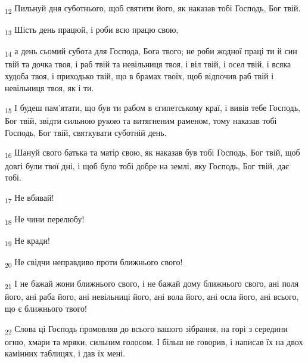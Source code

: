 \begin{tcolorbox}
\textsubscript{12} Пильнуй дня суботнього, щоб святити його, як наказав тобі Господь, Бог твій.
\end{tcolorbox}
\begin{tcolorbox}
\textsubscript{13} Шість день працюй, і роби всю працю свою,
\end{tcolorbox}
\begin{tcolorbox}
\textsubscript{14} а день сьомий субота для Господа, Бога твого; не роби жодної праці ти й син твій та дочка твоя, і раб твій та невільниця твоя, і віл твій, і осел твій, і всяка худоба твоя, і приходько твій, що в брамах твоїх, щоб відпочив раб твій і невільниця твоя, як і ти.
\end{tcolorbox}
\begin{tcolorbox}
\textsubscript{15} І будеш пам'ятати, що був ти рабом в єгипетському краї, і вивів тебе Господь, Бог твій, звідти сильною рукою та витягненим раменом, тому наказав тобі Господь, Бог твій, святкувати суботній день.
\end{tcolorbox}
\begin{tcolorbox}
\textsubscript{16} Шануй свого батька та матір свою, як наказав був тобі Господь, Бог твій, щоб довгі були твої дні, і щоб було тобі добре на землі, яку Господь, Бог твій, дає тобі.
\end{tcolorbox}
\begin{tcolorbox}
\textsubscript{17} Не вбивай!
\end{tcolorbox}
\begin{tcolorbox}
\textsubscript{18} Не чини перелюбу!
\end{tcolorbox}
\begin{tcolorbox}
\textsubscript{19} Не кради!
\end{tcolorbox}
\begin{tcolorbox}
\textsubscript{20} Не свідчи неправдиво проти ближнього свого!
\end{tcolorbox}
\begin{tcolorbox}
\textsubscript{21} І не бажай жони ближнього свого, і не бажай дому ближнього свого, ані поля його, ані раба його, ані невільниці його, ані вола його, ані осла його, ані всього, що є ближнього твого!
\end{tcolorbox}
\begin{tcolorbox}
\textsubscript{22} Слова ці Господь промовляв до всього вашого зібрання, на горі з середини огню, хмари та мряки, сильним голосом. І більш не говорив, і написав їх на двох камінних таблицях, і дав їх мені.
\end{tcolorbox}
